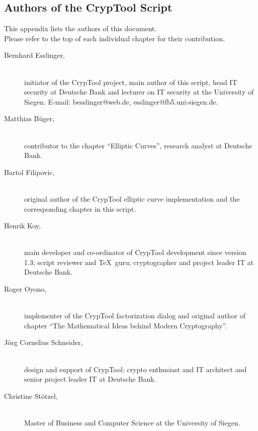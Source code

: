 
\hypertarget{appendix-authors}{}
\subsection{Authors of the CrypTool Script}
\label{s:appendix-authors}

This appendix lists the authors of this document.\\
Please refer to the top of each individual chapter for their contribution.

\begin{description}

\item[Bernhard Esslinger,] \mbox{}\\
initiator of the CrypTool project, main author of this script, head IT
security at Deutsche Bank and lecturer on IT security at the University
of Siegen.
E-mail: besslinger@web.de, esslinger@fb5.uni-siegen.de.
 
\item[Matthias B\"uger,] \mbox{}\\ 
contributor to the chapter ``Elliptic Curves'', research analyst at
Deutsche Bank.

\item[Bartol Filipovic,] \mbox{}\\
original author of the CrypTool elliptic curve
implementation and the corresponding chapter in this script.

\item[Henrik Koy, ] \mbox{}\\
main developer and co-ordinator of CrypTool development
since version 1.3; script reviewer and \TeX\ guru; cryptographer 
and project leader IT at Deutsche Bank.

\item[Roger Oyono, ] \mbox{}\\
implementer of the CrypTool factorization dialog and
original author of chapter ``The Mathematical Ideas behind Modern
Cryptography''.

\item[J\"org Cornelius Schneider,] \mbox{}\\
design and support of CrypTool; crypto enthusiast and IT architect and
senior project leader IT at Deutsche Bank.

\item[Christine St\"otzel,] \mbox{}\\
Master of Business and Computer Science at the University of Siegen.

\end{description}





